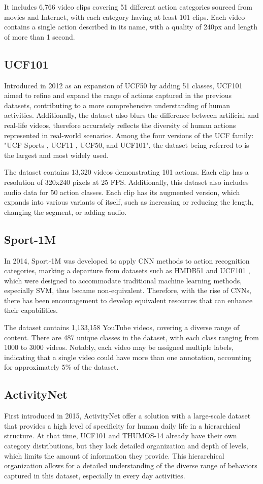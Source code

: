 \documentclass[a4paper]{article}
\begin{document}
It includes 6,766 video clips covering 51 different action categories sourced from movies and Internet, with each category having at least 101 clips. Each video contains a single action described in its name, with a quality of 240px and length of more than 1 second.
\subsection{UCF101}
Introduced in 2012 as an expansion of UCF50 by adding 51 classes, UCF101 \cite{UCF101} aimed to refine and expand the range of actions captured in the previous datasets, contributing to a more comprehensive understanding of human activities. Additionally, the dataset also blurs the difference between artificial and real-life videos, therefore accurately reflects the diversity of human actions represented in real-world scenarios. Among the four versions of the UCF family: "UCF Sports \cite{UCFSports}, UCF11 \cite{UCFYouTube}, UCF50, and UCF101", the dataset being referred to is the largest and most widely used.

The dataset contains 13,320 videos demonstrating 101 actions. Each clip has a resolution of 320x240 pixels at 25 FPS. Additionally, this dataset also includes audio data for 50 action classes. Each clip has its augmented version, which expands into various variants of itself, such as increasing or reducing the length, changing the segment, or adding audio.
\subsection{Sport-1M}
In 2014, Sport-1M \cite{Sports1M} was developed to apply CNN methods to action recognition categories, marking a departure from datasets such as HMDB51 \cite{HMDB51} and UCF101 \cite{UCF101}, which were designed to accommodate traditional machine learning methods, especially SVM, thus became non-equivalent. Therefore, with the rise of CNNs, there has been encouragement to develop equivalent resources that can enhance their capabilities.

The dataset contains 1,133,158 YouTube videos, covering a diverse range of content. There are 487 unique classes in the dataset, with each class ranging from 1000 to 3000 videos. Notably, each video may be assigned multiple labels, indicating that a single video could have more than one annotation, accounting for approximately 5\% of the dataset.
\subsection{ActivityNet}
First introduced in 2015, ActivityNet \cite{ActivityNet} offer a solution with a large-scale dataset that provides a high level of specificity for human daily life in a hierarchical structure. At that time, UCF101 \cite{UCF101} and THUMOS-14 \cite{THUMOS} already have their own category distributions, but they lack detailed organization and depth of levels, which limits the amount of information they provide. This hierarchical organization allows for a detailed understanding of the diverse range of behaviors captured in this dataset, especially in every day activities.
\end{document}
